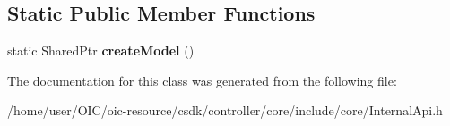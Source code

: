 \subsection*{Static Public Member Functions}
\begin{DoxyCompactItemize}
\item 
\hypertarget{classIntel_1_1CCFL_1_1API_1_1Model_a8bbb0299941b27d4ec441270daf1cbb2}{}static Shared\+Ptr {\bfseries create\+Model} ()\label{classIntel_1_1CCFL_1_1API_1_1Model_a8bbb0299941b27d4ec441270daf1cbb2}

\end{DoxyCompactItemize}


The documentation for this class was generated from the following file\+:\begin{DoxyCompactItemize}
\item 
/home/user/\+O\+I\+C/oic-\/resource/csdk/controller/core/include/core/Internal\+Api.\+h\end{DoxyCompactItemize}
